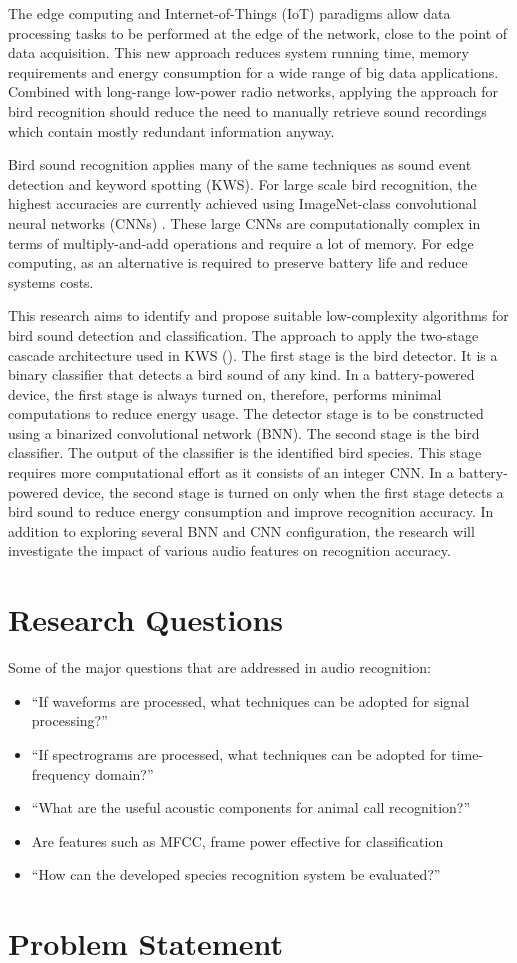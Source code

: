 The edge computing and Internet-of-Things (IoT) paradigms allow data processing tasks to be performed at the edge of the network, close to the point of data acquisition.
This new approach reduces system running time, memory requirements and energy consumption for a wide range of big data applications.
Combined with long-range low-power radio networks, applying the approach for bird recognition should reduce the need to manually retrieve sound recordings which contain mostly redundant information anyway.


Bird sound recognition applies many of the same techniques as sound event detection and keyword spotting (KWS).
For large scale bird recognition, the highest accuracies are currently achieved using ImageNet-class convolutional neural networks (CNNs) \citep{Kahl2019}.
These large CNNs are computationally complex in terms of multiply-and-add operations and require a lot of memory.
For edge computing, as an alternative is required to preserve battery life and reduce systems costs.

This research aims to identify and propose suitable low-complexity algorithms for bird sound detection and classification.
The approach to apply the two-stage cascade architecture used in KWS (\cite{Sigtia2018}).
The first stage is the bird detector.
It is a binary classifier that detects a bird sound of any kind. 
In a battery-powered device, the first stage is always turned on, therefore, performs minimal computations to reduce energy usage.
The detector stage is to be constructed using a binarized convolutional network (BNN). The second stage is the bird classifier.
The output of the classifier is the identified bird species.
This stage requires more computational effort as it consists of an integer CNN.
In a battery-powered device, the second stage is turned on only when the first stage detects a bird sound to reduce energy consumption and improve recognition accuracy.
In addition to exploring several BNN and CNN configuration, the research will investigate the impact of various audio features on recognition accuracy.


\section{Research Questions}

Some	 of	 the	major	 questions	 that	 are	 addressed	 in	 audio recognition:

\begin{itemize}
\item	 “If	 waveforms	 are	 processed,	 what	 techniques	 can	 be	 adopted	for	signal	processing?”
\item	“If	spectrograms	are	processed,	what	 techniques	can	be	
adopted	for	time-frequency	domain?”
\item	“What	are	the	useful	acoustic	components	for	animal	call	
recognition?”
\item Are features such as MFCC, frame power effective for classification
\item	 “How	 can	 the	 developed	 species	 recognition	 system	 be	 evaluated?”
\end{itemize}



\section{Problem Statement}
